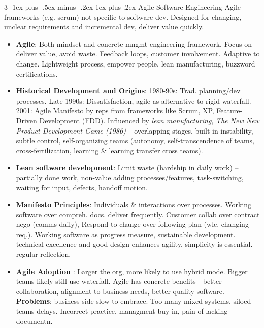 \documentclass[a4paper, 10pt, landscape]{article}
\makeatletter
\renewcommand{\subsubsection}{\@startsection{subsubsection}{3}{0mm}%
                                {-1ex plus -.5ex minus -.2ex}%
                                {1ex plus .2ex}%
                                {\normalfont\small\bfseries}}
\makeatother
\begin{document}
\begin{multicols*}{3}
\subsubsection{Agile Software Engineering}
Agile frameworks (e.g. scrum) not specific to software dev. Designed for changing, unclear requirements and incremental dev, deliver value quickly.
\begin{itemize}
\item \textbf{Agile}: Both mindset and concrete mngmt engineering framework. Focus on deliver value, avoid waste. Feedback loops, customer involvement. Adaptive to change. Lightweight process, empower people, lean manufacturing, buzzword certifications.
\item \textbf{Historical Development and Origins}: 1980-90s: Trad. planning/dev processes. Late 1990s: Dissatisfaction, agile as alternative to rigid waterfall. 2001: Agile Manifesto by reps from frameworks like Scrum, XP, Feature-Driven Development (FDD). Influenced by \textit{lean manufacturing}, \textit{The New New Product Development Game (1986)} -- overlapping stages, built in instability, subtle control, self-organizing teams (autonomy, self-transcendence of teams, cross-fertilization, learning \& learning transfer cross teams).
\item \textbf{Lean software development}: Limit waste (hardship in daily work) -- partially done work, non-value adding processes/features, task-switching, waiting for input, defects, handoff motion.
\item \textbf{Manifesto Principles}:  Individuals \& interactions over processes. Working software over compreh. docs. deliver frequently. Customer collab over contract nego (comms daily), Respond to change over following plan (wlc. changing req.). Working software as progress measure, sustainable development. technical excellence and good design enhances agility, simplicity is essential. regular reflection.
\item \textbf{Agile Adoption }: Larger the org, more likely to use hybrid mode. Bigger teams likely still use waterfall. Agile has concrete benefits - better collaboration, alignment to business needs, better quality software. \textbf{Problems}: business side slow to embrace. Too many mixed systems, siloed teams delays. Incorrect practice, managment buy-in, pain of lacking documentn.
\end{itemize}


\end{multicols*}
\end{document}
